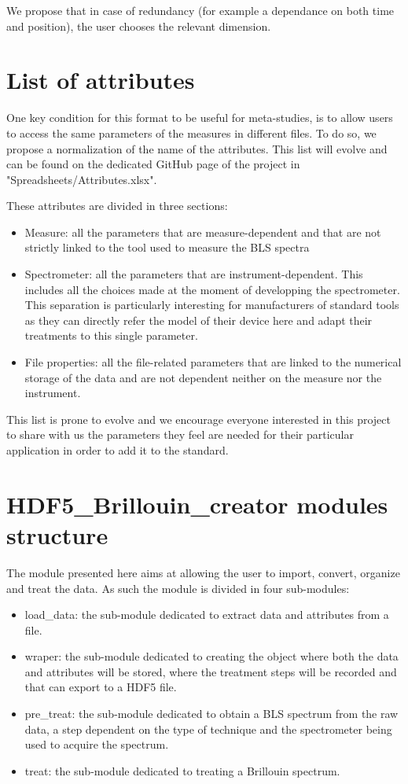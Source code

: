 \documentclass[11pt]{article}
\begin{document}
  We propose that in case of redundancy (for example a dependance on both time and position), the user chooses the relevant dimension.

\section{List of attributes}

One key condition for this format to be useful for meta-studies, is to allow users to access the same parameters of the measures in different files. To do so, we propose a normalization of the name of the attributes. This list will evolve and can be found on the dedicated GitHub page of the project in "Spreadsheets/Attributes.xlsx".

These attributes are divided in three sections:
\begin{itemize}
  \item Measure: all the parameters that are measure-dependent and that are not strictly linked to the tool used to measure the BLS spectra
  \item Spectrometer: all the parameters that are instrument-dependent. This includes all the choices made at the moment of developping the spectrometer. This separation is particularly interesting for manufacturers of standard tools as they can directly refer the model of their device here and adapt their treatments to this single parameter. 
  \item File properties: all the file-related parameters that are linked to the numerical storage of the data and are not dependent neither on the measure nor the instrument.
\end{itemize}

This list is prone to evolve and we encourage everyone interested in this project to share with us the parameters they feel are needed for their particular application in order to add it to the standard. 

\section{HDF5\_Brillouin\_creator modules structure}

    The module presented here aims at allowing the user to import, convert, organize and treat the data. As such the module is divided in four sub-modules:
    \begin{itemize}
      \item load\_data: the sub-module dedicated to extract data and attributes from a file.
      \item wraper: the sub-module dedicated to creating the object where both the data and attributes will be stored, where the treatment steps will be recorded and that can export to a HDF5 file.
      \item pre\_treat: the sub-module dedicated to obtain a BLS spectrum from the raw data, a step dependent on the type of technique and the spectrometer being used to acquire the spectrum.
      \item treat: the sub-module dedicated to treating a Brillouin spectrum.
    \end{itemize}
\end{document}

